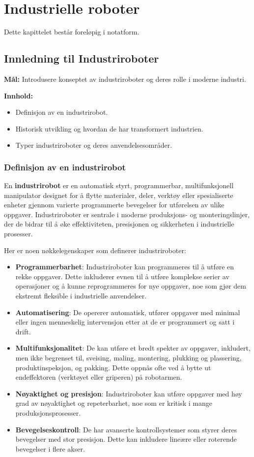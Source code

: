 
\chapter{Industrielle roboter}

Dette kapittelet består foreløpig i notatform. 

\section{Innledning til Industriroboter}

\textbf{Mål:} Introdusere konseptet av industriroboter og deres rolle i moderne industri.

\textbf{Innhold:}
\begin{itemize}
    \item Definisjon av en industrirobot.
    \item Historisk utvikling og hvordan de har transformert industrien.
    \item Typer industriroboter og deres anvendelsesområder.
\end{itemize}

\subsection{Definisjon av en industrirobot}
En \textbf{industrirobot} er en automatisk styrt, programmerbar, multifunksjonell manipulator designet for å flytte materialer, deler, verktøy eller spesialiserte enheter gjennom varierte programmerte bevegelser for utførelsen av ulike oppgaver. Industriroboter er sentrale i moderne produksjons- og monteringslinjer, der de bidrar til å øke effektiviteten, presisjonen og sikkerheten i industrielle prosesser.

Her er noen nøkkelegenskaper som definerer industriroboter:

\begin{itemize}
    \item \textbf{Programmerbarhet}: Industriroboter kan programmeres til å utføre en rekke oppgaver. Dette inkluderer evnen til å utføre komplekse serier av operasjoner og å kunne reprogrammeres for nye oppgaver, noe som gjør dem ekstremt fleksible i industrielle anvendelser.
    \item \textbf{Automatisering}: De opererer automatisk, utfører oppgaver med minimal eller ingen menneskelig intervensjon etter at de er programmert og satt i drift.
    \item \textbf{Multifunksjonalitet}: De kan utføre et bredt spekter av oppgaver, inkludert, men ikke begrenset til, sveising, maling, montering, plukking og plassering, produktinspeksjon, og pakking. Dette oppnås ofte ved å bytte ut endeffektoren (verktøyet eller griperen) på robotarmen.
    \item \textbf{Nøyaktighet og presisjon}: Industriroboter kan utføre oppgaver med høy grad av nøyaktighet og repeterbarhet, noe som er kritisk i mange produksjonsprosesser.
    \item \textbf{Bevegelseskontroll}: De har avanserte kontrollsystemer som styrer deres bevegelser med stor presisjon. Dette kan inkludere lineære eller roterende bevegelser i flere akser.
\end{itemize}

